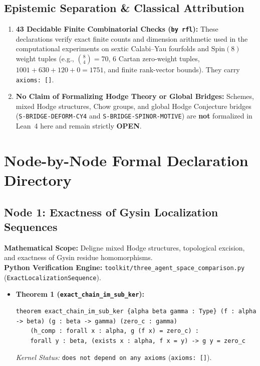 \documentclass[11pt,a4paper]{article}
\begin{document}
\subsection{Epistemic Separation \& Classical Attribution}
\begin{enumerate}[leftmargin=2em]
\item \textbf{43 Decidable Finite Combinatorial Checks (\texttt{by rfl}):}
These declarations verify exact finite counts and dimension arithmetic used in the computational experiments on sextic Calabi--Yau fourfolds and $\mathrm{Spin}(8)$ weight tuples (e.g., $\binom{8}{4} = 70$, $6$ Cartan zero-weight tuples, $1001 + 630 + 120 + 0 = 1751$, and finite rank-vector bounds). They carry \texttt{axioms: []}.
\item \textbf{No Claim of Formalizing Hodge Theory or Global Bridges:}
Schemes, mixed Hodge structures, Chow groups, and global Hodge Conjecture bridges (\texttt{S-BRIDGE-DEFORM-CY4} and \texttt{S-BRIDGE-SPINOR-MOTIVE}) are \textbf{not} formalized in Lean~4 here and remain strictly \textbf{OPEN}.
\end{enumerate}

\newpage
\section{Node-by-Node Formal Declaration Directory}

\subsection{Node 1: Exactness of Gysin Localization Sequences}
\textbf{Mathematical Scope:} Deligne mixed Hodge structures, topological excision, and exactness of Gysin residue homomorphisms.\\
\textbf{Python Verification Engine:} \texttt{toolkit/three\_agent\_space\_comparison.py} (\texttt{ExactLocalizationSequence}).
\begin{itemize}[leftmargin=1.5em]
\item \textbf{Theorem 1 (\texttt{exact\_chain\_im\_sub\_ker}):}
\begin{lstlisting}[style=leancode]
theorem exact_chain_im_sub_ker {alpha beta gamma : Type} (f : alpha -> beta) (g : beta -> gamma) (zero_c : gamma)
    (h_comp : forall x : alpha, g (f x) = zero_c) :
    forall y : beta, (exists x : alpha, f x = y) -> g y = zero_c
\end{lstlisting}
\textit{Kernel Status:} \texttt{does not depend on any axioms} (\texttt{axioms: []}).
\end{itemize}
\end{document}
